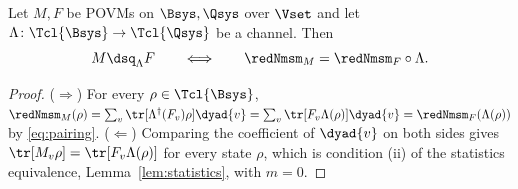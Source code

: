 
\begin{lemma}\label{lem:msmfact}
Let $M,F$ be POVMs on $\Bsys,\Qsys$ over $\Vset$ and let
$\Lambda\colon\Tcl{\Bsys}\to\Tcl{\Qsys}$ be a channel. Then
\begin{equation}\label{eq:msmfact}
  M\dsq_{\Lambda}F
  \qquad\Longleftrightarrow\qquad
  \redNmsm_M=\redNmsm_F\circ\Lambda .
\end{equation}
\end{lemma}

\begin{proof}
($\Rightarrow$) For every $\rho\in\Tcl{\Bsys}$,
$\redNmsm_M(\rho)=\sum_v\tr[\Lambda^{\dagger}(F_v)\rho]\dyad{v}
=\sum_v\tr[F_v\Lambda(\rho)]\dyad{v}=\redNmsm_F(\Lambda(\rho))$ by
\eqref{eq:pairing}. ($\Leftarrow$) Comparing the coefficient of $\dyad{v}$ on
both sides gives $\tr[M_v\rho]=\tr[F_v\Lambda(\rho)]$ for every state $\rho$,
which is condition (ii) of the statistics equivalence,
Lemma~\ref{lem:statistics}, with $m=0$.
\end{proof}

